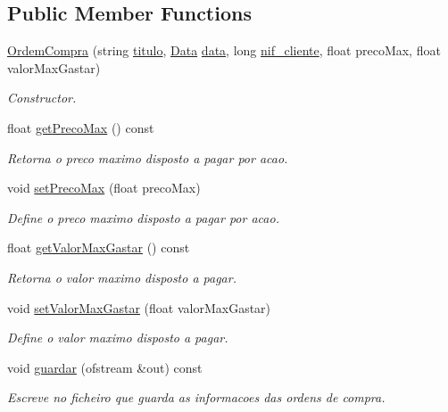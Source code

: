 \subsection*{Public Member Functions}
\begin{DoxyCompactItemize}
\item 
\hyperlink{class_ordem_compra_a98bff4c9185593d197e72a7f14e5856f}{Ordem\+Compra} (string \hyperlink{class_ordem_a0773861bd9fb956d5ec62f2ef1de658b}{titulo}, \hyperlink{class_data}{Data} \hyperlink{class_ordem_a9f4dbc2966e98dcbd7e300ae346d8535}{data}, long \hyperlink{class_ordem_af6d06b4250735ae531bdcef5fa332f02}{nif\+\_\+cliente}, float preco\+Max, float valor\+Max\+Gastar)
\begin{DoxyCompactList}\small\item\em Constructor. \end{DoxyCompactList}\item 
float \hyperlink{class_ordem_compra_a2c4117480fead3d38c34e7491007503d}{get\+Preco\+Max} () const
\begin{DoxyCompactList}\small\item\em Retorna o preco maximo disposto a pagar por acao. \end{DoxyCompactList}\item 
void \hyperlink{class_ordem_compra_aab6b393722db7f13fa0c37eddb1b4b04}{set\+Preco\+Max} (float preco\+Max)
\begin{DoxyCompactList}\small\item\em Define o preco maximo disposto a pagar por acao. \end{DoxyCompactList}\item 
float \hyperlink{class_ordem_compra_a29931277d9029de1cb8a176694f38085}{get\+Valor\+Max\+Gastar} () const
\begin{DoxyCompactList}\small\item\em Retorna o valor maximo disposto a pagar. \end{DoxyCompactList}\item 
void \hyperlink{class_ordem_compra_ada9283bb3eda59fd0f6b10aa7e2b86c2}{set\+Valor\+Max\+Gastar} (float valor\+Max\+Gastar)
\begin{DoxyCompactList}\small\item\em Define o valor maximo disposto a pagar. \end{DoxyCompactList}\item 
void \hyperlink{class_ordem_compra_ae4c663bb3b6d507fabc7d02fa244cd56}{guardar} (ofstream \&out) const
\begin{DoxyCompactList}\small\item\em Escreve no ficheiro que guarda as informacoes das ordens de compra. \end{DoxyCompactList}\end{DoxyCompactItemize}
